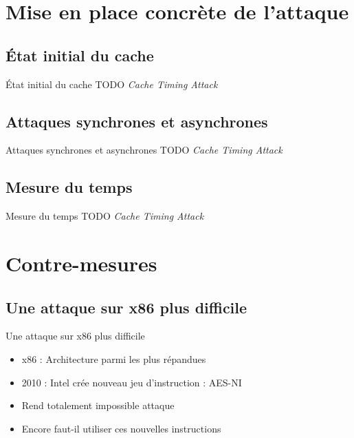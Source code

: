 \documentclass[11pt]{beamer}
\begin{document}
\section{Mise en place concrète de l'attaque}

\subsection{État initial du cache} 
\begin{frame}{État initial du cache}
TODO \emph{Cache Timing Attack} 
\end{frame}

\subsection{Attaques synchrones et asynchrones}
\begin{frame}{Attaques synchrones et asynchrones}
TODO \emph{Cache Timing Attack} 
\end{frame}

\subsection{Mesure du temps}
\begin{frame}{Mesure du temps}
TODO \emph{Cache Timing Attack} 
\end{frame}

\section{Contre-mesures}

\subsection{Une attaque sur x86 plus difficile}
\begin{frame}{Une attaque sur x86 plus difficile}
	\begin{itemize}
		\item x86 : Architecture parmi les plus répandues
		\item 2010 : Intel crée nouveau jeu d'instruction : AES-NI
		\item Rend totalement impossible attaque
		\item Encore faut-il utiliser ces nouvelles instructions
	\end{itemize}
\end{frame}
\end{document}
